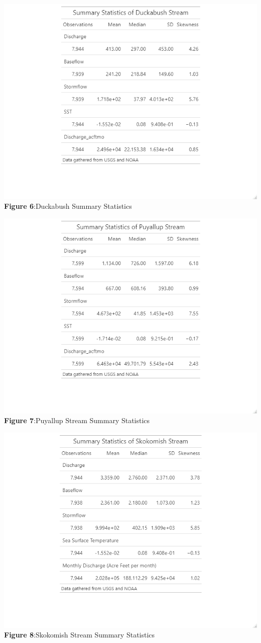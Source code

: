 \documentclass[
  12pt,
]{article}
\begin{document}
\includegraphics{Data/Processed/SummaryStats/DuckSummStats.jpeg}
\textbf{Figure 6}:Duckabush Summary Statistics

\includegraphics{Data/Processed/SummaryStats/PuyaSummStats.jpeg}
\textbf{Figure 7}:Puyallup Stream Summary Statistics

\includegraphics{Data/Processed/SummaryStats/SkokomishSummStats.jpeg}
\textbf{Figure 8}:Skokomish Stream Summary Statistics
\end{document}
